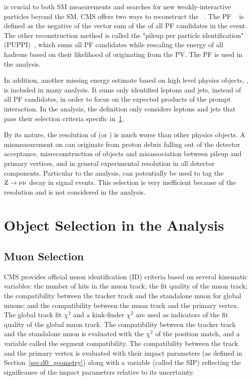 \MET is crucial to both SM measurements and searches for new weakly-interactive particles beyond the SM.
CMS offers two ways to reconstruct the \MET~\cite{Sirunyan_2019}.
The PF \MET~\cite{collaboration_2015} is defined as the negative of the vector sum of the \pt of all PF candidates in the event.
The other reconstruction method is called the "pileup per particle identification" (PUPPI)~\cite{Bertolini2014},
which sums all PF candidates while rescaling the energy of all hadrons based on their likelihood of originating from the PV.
The PF \MET is used in the \hmm analysis.

In addition, another missing energy estimate based on high level physics objects, \MHT, is included in many analysis.
It sums only identified leptons and jets, instead of all PF candidates, 
in order to focus on the expected products of the prompt interaction.
In the \hmm analysis, the \MHT definition only considers leptons and jets that pass their selection criteria specific in~\ref{sec:obj_sel}. 

By its nature, the resolution of \MET (or \MHT) is much worse than other physics objects.
A mismeasurement on \MET can originate from proton debris falling out of the detector acceptance,
misreconstruction of objects and misassociation between pileup and primary vertices,
and in general experimental resolution in all detector components.
Particular to the \hmm analysis, \MET can potentially be used to tag the $\mathrm{Z} \to \nu\nu$ decay in \ZH signal events.
This selection is very inefficient because of the \MET resolution and is not considered in the \hmm analysis.

\section{Object Selection in the \texorpdfstring{\hmm}{H to Muons} Analysis}\label{sec:obj_sel}

\subsection{Muon Selection}\label{sec:sel_muon}

CMS provides official muon identification (ID) criteria based on several kinematic variables:
the number of hits in the muon track; the fit quality of the muon track; 
the compatibility between the tracker track and the standalone muon for global muons;
and the compatibility between the muon track and the primary vertex.
The global track fit $\chi^{2}$ and a kink-finder $\chi^{2}$ are used as indicators of the fit quality of the global muon track.
The compatibility between the tracker track and the standalone muon is evaluated with the $\chi^{2}$ of the position match, 
and a variable called the segment compatibility.
The compatibility between the track and the primary vertex is evaluated with their impact parameters (as defined in Section~\ref{sec:d0_geometry})
along with a variable (called the SIP) reflecting the significance of the impact parameters relative to its uncertainty.

